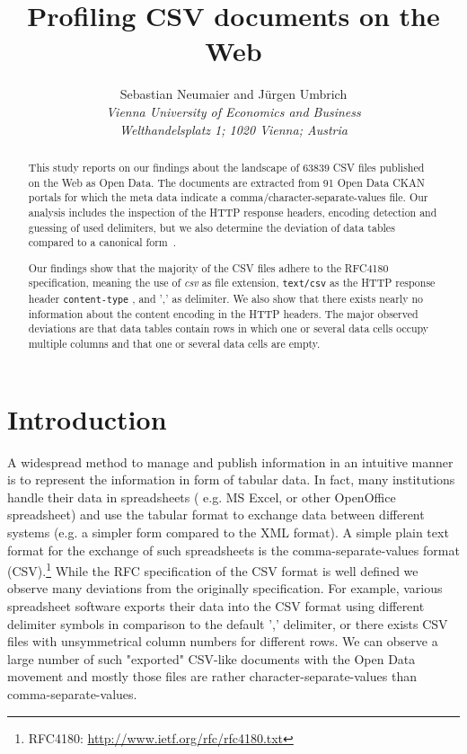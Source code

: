 \documentclass{scrartcl}
\title{Profiling CSV documents on the Web}
\subtitle{}
\author{Sebastian Neumaier and J\"urgen Umbrich \\\textit{Vienna University of Economics and Business}\\ \textit{Welthandelsplatz 1; 1020 Vienna; Austria}}
\date{}
\begin{document}
\maketitle
\begin{abstract}
This study reports on our findings about the landscape of 63839 CSV files published on the Web as Open Data.
The documents are extracted from 91 Open Data CKAN portals for which the meta data indicate a comma/character-separate-values file.
Our analysis includes the inspection of the HTTP response headers, encoding detection and guessing of used delimiters, but we also determine the deviation of data tables compared to a canonical form~\cite{ermilov:2013aa}.

Our findings show that the majority of the CSV files adhere to the RFC4180 specification, meaning the use of \textit{csv} as file extension, \texttt{text/csv} as the HTTP response header \texttt{content-type} , and ',' as delimiter.
We also show that there exists nearly no information about the content encoding in the HTTP headers.
The major observed deviations are that data tables contain rows in which one or several data cells occupy multiple columns and that one or several data cells are empty.

\end{abstract}
\newpage

\tableofcontents
\newpage
\section{Introduction}
A widespread method to manage and publish information in an intuitive manner is to represent the information in form of tabular data.
In fact, many institutions handle their data in spreadsheets ( e.g. MS Excel, or other OpenOffice spreadsheet) and use the tabular format to exchange data between different systems (e.g. a simpler form compared to the XML format).
A simple plain text format for the exchange of such spreadsheets is the comma-separate-values format (CSV).\footnote{RFC4180: \url{http://www.ietf.org/rfc/rfc4180.txt}} 
While the RFC specification of the CSV format is well defined
we observe many deviations from the originally specification. 
For example, various spreadsheet software exports their data into the CSV format using different delimiter symbols in comparison to the default ',' delimiter, or there exists CSV files with unsymmetrical column numbers for different rows. 
We can observe a large number of such "exported" CSV-like documents with the Open Data movement and mostly those files are rather character-separate-values than comma-separate-values.
\end{document}
